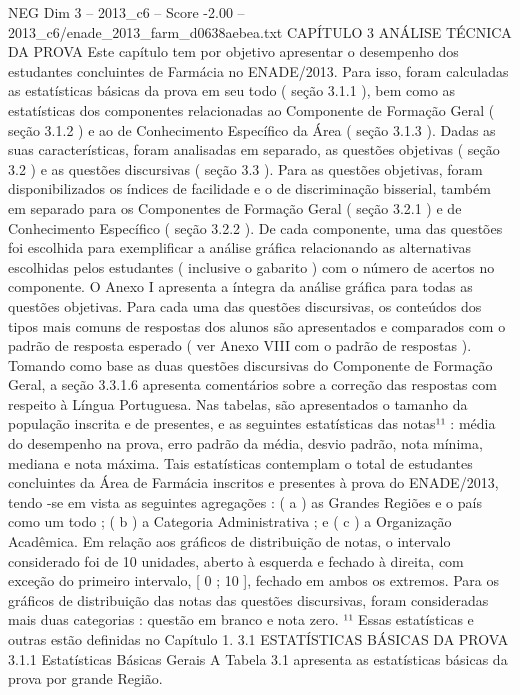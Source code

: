 \begin{textsample}{NEG Dim 3 – 2013\_c6 – Score -2.00 – 2013\_c6/enade\_2013\_farm\_d0638aebea.txt}  \label{ex:f3_neg_051}
CAPÍTULO 3 ANÁLISE TÉCNICA DA PROVA Este capítulo tem por objetivo apresentar o desempenho dos estudantes concluintes de Farmácia no ENADE/2013.
Para isso, foram calculadas as estatísticas básicas da prova em seu todo ( seção 3.1.1 ), bem como as estatísticas dos componentes relacionadas ao Componente de Formação Geral ( seção 3.1.2 ) e ao de Conhecimento Específico da Área ( seção 3.1.3 ).
Dadas as suas características, foram analisadas em separado, as questões objetivas ( seção 3.2 ) e as questões discursivas ( seção 3.3 ).
Para as questões objetivas, foram disponibilizados os índices de facilidade e o de discriminação bisserial, também em separado para os Componentes de Formação Geral ( seção 3.2.1 ) e de Conhecimento Específico ( seção 3.2.2 ).
De cada componente, uma das questões foi escolhida para exemplificar a análise gráfica relacionando as alternativas escolhidas pelos estudantes ( inclusive o gabarito ) com o número de acertos no componente.
O Anexo I apresenta a íntegra da análise gráfica para todas as questões objetivas.
Para cada uma das questões discursivas, os conteúdos dos tipos mais comuns de respostas dos alunos são apresentados e comparados com o padrão de resposta esperado ( ver Anexo VIII com o padrão de respostas ).
Tomando como base as duas questões discursivas do Componente de Formação Geral, a seção 3.3.1.6 apresenta comentários sobre a correção das respostas com respeito à Língua Portuguesa.
Nas tabelas, são apresentados o tamanho da população inscrita e de presentes, e as seguintes estatísticas das notas¹¹ : média do desempenho na prova, erro padrão da média, desvio padrão, nota mínima, mediana e nota máxima.
Tais estatísticas contemplam o total de estudantes concluintes da Área de Farmácia inscritos e presentes à prova do ENADE/2013, tendo -se em vista as seguintes agregações : ( a ) as Grandes Regiões e o país como um todo ; ( b ) a Categoria Administrativa ; e ( c ) a Organização Acadêmica.
Em relação aos gráficos de distribuição de notas, o intervalo considerado foi de 10 unidades, aberto à esquerda e fechado à direita, com exceção do primeiro intervalo, [ 0 ; 10 ], fechado em ambos os extremos.
Para os gráficos de distribuição das notas das questões discursivas, foram consideradas mais duas categorias : questão em branco e nota zero. ¹¹ Essas estatísticas e outras estão definidas no Capítulo 1. 3.1 ESTATÍSTICAS BÁSICAS DA PROVA 3.1.1 Estatísticas Básicas Gerais A Tabela 3.1 apresenta as estatísticas básicas da prova por grande Região.

\end{textsample}
